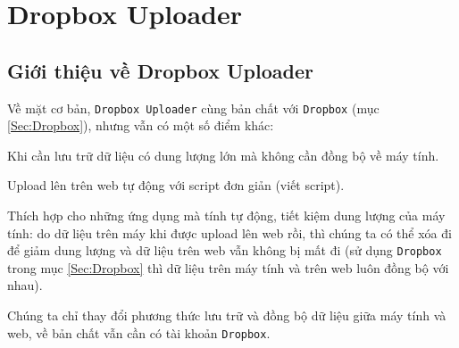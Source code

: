 \section{Dropbox Uploader}
\subsection{Giới thiệu về Dropbox Uploader}
Về mặt cơ bản, \verb|Dropbox Uploader| cùng bản chất với \verb|Dropbox| (mục \ref{Sec:Dropbox}), nhưng vẫn có một số điểm khác:
\begin{list}{--}{}
\item Khi cần lưu trữ dữ liệu có dung lượng lớn mà không cần đồng bộ về máy tính.
\item Upload lên trên web tự động với script đơn giản (viết script).
\item Thích hợp cho những ứng dụng mà tính tự động, tiết kiệm dung lượng của máy tính: do dữ liệu trên máy khi được upload lên web rồi, thì chúng ta có thể xóa đi để giảm dung lượng và dữ liệu trên web vẫn không bị mất đi (sử dụng \verb|Dropbox| trong mục \ref{Sec:Dropbox} thì dữ liệu trên máy tính và trên web luôn đồng bộ với nhau).
\end{list}

Chúng ta chỉ thay đổi phương thức lưu trữ và đồng bộ dữ liệu giữa máy tính và web, về bản chất vẫn cần có tài khoản \verb|Dropbox|.
